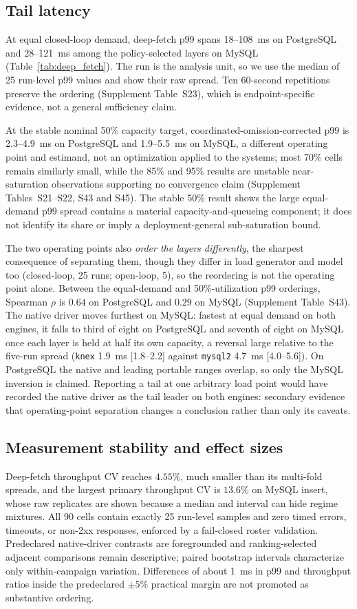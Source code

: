 \subsection{Tail latency}
At equal closed-loop demand, deep-fetch p99 spans 18--108~ms on PostgreSQL and 28--121~ms among the
policy-selected layers on MySQL (Table~\ref{tab:deep_fetch}). The run is the analysis unit, so we
use the median of 25 run-level p99 values and show their raw spread. Ten 60-second repetitions
preserve the ordering (Supplement Table~S23), which is endpoint-specific evidence, not a general
sufficiency claim.

At the stable nominal 50\% capacity target, coordinated-omission-corrected p99 is 2.3--4.9~ms on
PostgreSQL and 1.9--5.5~ms on MySQL, a different operating point and estimand, not an optimization
applied to the systems; most 70\% cells remain similarly small, while the 85\% and 95\% results are
unstable near-saturation observations supporting no convergence claim (Supplement Tables~S21--S22,
S43 and S45). The stable 50\% result shows the large equal-demand p99 spread contains a material
capacity-and-queueing component; it does not identify its share or imply a deployment-general
sub-saturation bound.

The two operating points also \emph{order the layers differently}, the sharpest consequence of
separating them, though they differ in load generator and model too (closed-loop, 25 runs;
open-loop, 5), so the reordering is not the operating point alone. Between the equal-demand and
50\%-utilization p99 orderings, Spearman $\rho$ is $0.64$ on PostgreSQL and $0.29$ on MySQL
(Supplement Table~S43). The native driver moves furthest on MySQL: fastest at equal demand on both
engines, it falls to third of eight on PostgreSQL and seventh of eight on MySQL once each layer is
held at half its own capacity, a reversal large relative to the five-run spread (\texttt{knex}
1.9~ms [1.8--2.2] against \texttt{mysql2} 4.7~ms [4.0--5.6]). On PostgreSQL the native and leading
portable ranges overlap, so only the MySQL inversion is claimed. Reporting a tail at one arbitrary
load point would have recorded the native driver as the tail leader on both engines: secondary
evidence that operating-point separation changes a conclusion rather than only its caveats.

\subsection{Measurement stability and effect sizes}
Deep-fetch throughput CV reaches $4.55\%$, much smaller than its multi-fold spreads, and the
largest primary throughput CV is $13.6\%$ on MySQL insert, whose raw replicates are shown because a
median and interval can hide regime mixtures. All 90 cells contain exactly 25 run-level samples and
zero timed errors, timeouts, or non-2xx responses, enforced by a fail-closed roster validation.
Predeclared native-driver contrasts are foregrounded and ranking-selected adjacent comparisons
remain descriptive; paired bootstrap intervals characterize only within-campaign variation.
Differences of about 1~ms in p99 and throughput ratios inside the predeclared $\pm5\%$ practical
margin are not promoted as substantive ordering.
